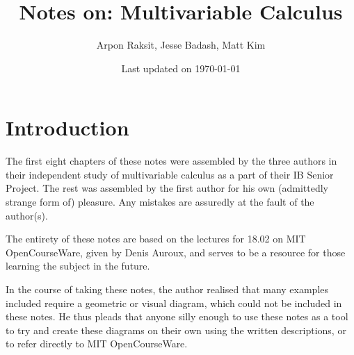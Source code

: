 \title{Notes on: Multivariable Calculus}
\author{Arpon Raksit, Jesse Badash, Matt Kim}
\date{Last updated on \today}
\maketitle
\thispagestyle{empty}

\newpage 
\setcounter{page}{1}
\section*{Introduction}

The first eight chapters of these notes were assembled by the three authors in their independent study of multivariable calculus as a part of their IB Senior Project. The rest was assembled by the first author for his own (admittedly strange form of) pleasure. Any mistakes are assuredly at the fault of the author(s).

The entirety of these notes are based on the lectures for 18.02 on MIT OpenCourseWare, given by Denis Auroux, and serves to be a resource for those learning the subject in the future. 

In the course of taking these notes, the author realised that many examples included require a geometric or visual diagram, which could not be included in these notes. He thus pleads that anyone silly enough to use these notes as a tool to try and create these diagrams on their own using the written descriptions, or to refer directly to MIT OpenCourseWare.

\vspace{25 pt}
\tableofcontents

\newpage

